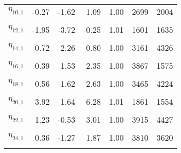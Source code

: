 \begin{table}
\begin{tabular}[t]{lrrrrrr}
$\eta_{10, 1}$ & -0.27 & -1.62 & 1.09 & 1.00 & 2699 & 2004\\
\cellcolor{gray!6}{$\eta_{11, 1}$} & \cellcolor{gray!6}{-0.90} & \cellcolor{gray!6}{-2.30} & \cellcolor{gray!6}{0.49} & \cellcolor{gray!6}{1.00} & \cellcolor{gray!6}{2875} & \cellcolor{gray!6}{2233}\\
$\eta_{12, 1}$ & -1.95 & -3.72 & -0.25 & 1.01 & 1601 & 1635\\
\cellcolor{gray!6}{$\eta_{13, 1}$} & \cellcolor{gray!6}{1.19} & \cellcolor{gray!6}{-0.27} & \cellcolor{gray!6}{2.69} & \cellcolor{gray!6}{1.00} & \cellcolor{gray!6}{2347} & \cellcolor{gray!6}{1001}\\
$\eta_{14, 1}$ & -0.72 & -2.26 & 0.80 & 1.00 & 3161 & 4326\\
\cellcolor{gray!6}{$\eta_{15, 1}$} & \cellcolor{gray!6}{0.10} & \cellcolor{gray!6}{-2.27} & \cellcolor{gray!6}{2.38} & \cellcolor{gray!6}{1.00} & \cellcolor{gray!6}{2364} & \cellcolor{gray!6}{1506}\\
$\eta_{16, 1}$ & 0.39 & -1.53 & 2.35 & 1.00 & 3867 & 1575\\
\cellcolor{gray!6}{$\eta_{17, 1}$} & \cellcolor{gray!6}{1.39} & \cellcolor{gray!6}{-0.34} & \cellcolor{gray!6}{3.24} & \cellcolor{gray!6}{1.02} & \cellcolor{gray!6}{167} & \cellcolor{gray!6}{591}\\
$\eta_{18, 1}$ & 0.56 & -1.62 & 2.63 & 1.00 & 3465 & 4224\\
\cellcolor{gray!6}{$\eta_{19, 1}$} & \cellcolor{gray!6}{1.81} & \cellcolor{gray!6}{0.21} & \cellcolor{gray!6}{3.47} & \cellcolor{gray!6}{1.00} & \cellcolor{gray!6}{3882} & \cellcolor{gray!6}{4614}\\
$\eta_{20, 1}$ & 3.92 & 1.64 & 6.28 & 1.01 & 1861 & 1554\\
\cellcolor{gray!6}{$\eta_{21, 1}$} & \cellcolor{gray!6}{-0.20} & \cellcolor{gray!6}{-2.22} & \cellcolor{gray!6}{1.80} & \cellcolor{gray!6}{1.00} & \cellcolor{gray!6}{3412} & \cellcolor{gray!6}{2046}\\
$\eta_{22, 1}$ & 1.23 & -0.53 & 3.01 & 1.00 & 3915 & 4427\\
\cellcolor{gray!6}{$\eta_{23, 1}$} & \cellcolor{gray!6}{1.41} & \cellcolor{gray!6}{-0.50} & \cellcolor{gray!6}{3.41} & \cellcolor{gray!6}{1.00} & \cellcolor{gray!6}{3253} & \cellcolor{gray!6}{3432}\\
$\eta_{24, 1}$ & 0.36 & -1.27 & 1.87 & 1.00 & 3810 & 3620\\
\cellcolor{gray!6}{$\eta_{25, 1}$} & \cellcolor{gray!6}{1.78} & \cellcolor{gray!6}{-0.14} & \cellcolor{gray!6}{3.82} & \cellcolor{gray!6}{1.01} & \cellcolor{gray!6}{2675} & \cellcolor{gray!6}{3296}\\

\end{tabular}
\end{table}
